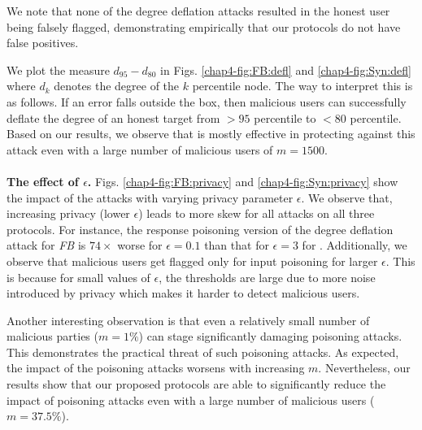 We note that none of the degree deflation attacks resulted in the honest user being falsely flagged, demonstrating empirically  that our protocols do not have false positives.

We plot the measure $d_{95}-d_{80}$ in Figs. \ref{chap4-fig:FB:defl} and \ref{chap4-fig:Syn:defl} where $d_{k}$ denotes the degree of the $k$ percentile node. The way to interpret this is as follows. If an error falls outside the box, then malicious users can successfully deflate the degree of an honest target from $>95$ percentile to $<80$ percentile. Based on our results, we observe that \DegHybrid{} is mostly effective in protecting against this attack even with a large number of malicious users of $m=1500$. 
\\\\
\noindent\textbf{The effect of $\epsilon$.} Figs. \ref{chap4-fig:FB:privacy} and \ref{chap4-fig:Syn:privacy} show the impact of the attacks with varying privacy parameter $\epsilon$. We observe that, increasing privacy (lower $\epsilon$) leads to more skew for all attacks on all three protocols. For instance, the response poisoning version of the degree deflation attack for \textit{FB}  is $74\times$ worse for $\epsilon=0.1$ than that for $\epsilon=3$ for \DegRRCheck{}. Additionally, we observe that malicious users get flagged only for input poisoning for larger $\epsilon$. This is because for small values of $\epsilon$, the thresholds are large due to more noise introduced by privacy which makes it harder to detect malicious users. 
\par Another interesting observation is that even a relatively small number of malicious parties ($m=1\%$) can stage significantly damaging poisoning attacks. This demonstrates the practical threat of such poisoning attacks. As expected, the impact of the poisoning attacks worsens with increasing $m$. Nevertheless, our results show that our proposed protocols are able to significantly reduce the impact of poisoning attacks even with a large number of malicious users ($m=37.5\%$).

